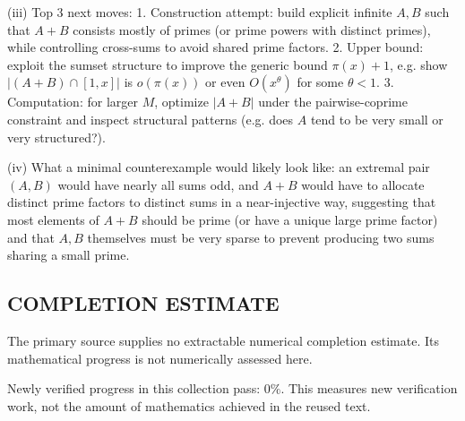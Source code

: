 (iii) Top 3 next moves:
1. Construction attempt: build explicit infinite $A,B$ such that $A+B$ consists mostly of primes (or prime powers with distinct primes), while controlling cross-sums to avoid shared prime factors.
2. Upper bound: exploit the sumset structure to improve the generic bound $\pi(x)+1$, e.g. show $|(A+B)\cap[1,x]|$ is $o(\pi(x))$ or even $O(x^\theta)$ for some $\theta<1$.
3. Computation: for larger $M$, optimize $|A+B|$ under the pairwise-coprime constraint and inspect structural patterns (e.g. does $A$ tend to be very small or very structured?).

(iv) What a minimal counterexample would likely look like: an extremal pair $(A,B)$ would have nearly all sums odd, and $A+B$ would have to allocate distinct prime factors to distinct sums in a near-injective way, suggesting that most elements of $A+B$ should be prime (or have a unique large prime factor) and that $A,B$ themselves must be very sparse to prevent producing two sums sharing a small prime.




\subsection*{COMPLETION ESTIMATE}
The primary source supplies no extractable numerical completion estimate. Its mathematical progress is not numerically assessed here.

Newly verified progress in this collection pass: $0\%$. This measures new verification work, not the amount of mathematics achieved in the reused text.
